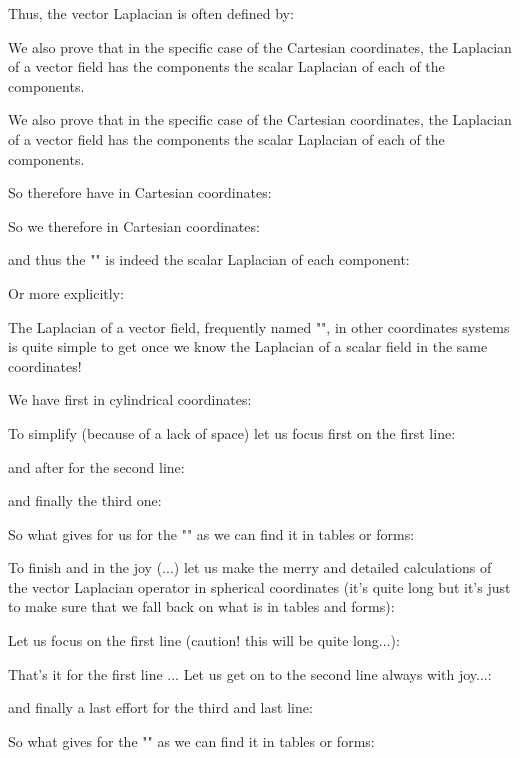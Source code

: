 	Thus, the vector Laplacian is often defined by:
	
	We also prove that in the specific case of the Cartesian coordinates, the Laplacian of a vector field has the components the scalar Laplacian of each of the components.
	
	We also prove that in the specific case of the Cartesian coordinates, the Laplacian of a vector field has the components the scalar Laplacian of each of the components.
	
	So therefore have in Cartesian coordinates:
	
	So we therefore in Cartesian coordinates:
	
	and thus the "" is indeed the scalar Laplacian of each component:
	
	Or more explicitly:
	
	The Laplacian of a vector field, frequently named "", in other coordinates systems is quite simple to get once we know the Laplacian of a scalar field in the same coordinates!
	
	We have first in cylindrical coordinates:
	
	To simplify (because of a lack of space) let us focus first on the first line:
	
	and after for the second line:
	
	and finally the third one:
	
	So what gives for us for the "" as we can find it in tables or forms:
	
	To finish and in the joy (...) let us make the merry and detailed calculations of the vector Laplacian operator in spherical coordinates (it's quite long but it's just to make sure that we fall back on what is in tables and forms):
	
	Let us focus on the first line (caution! this will be quite long...):
	
	\pagebreak
	
	That's it for the first line ... Let us get on to the second line always with joy...:
	
	
	\pagebreak
	and finally a last effort for the third and last line:
	

	\pagebreak
	
	So what gives for the "" as we can find it in tables or forms:
	
